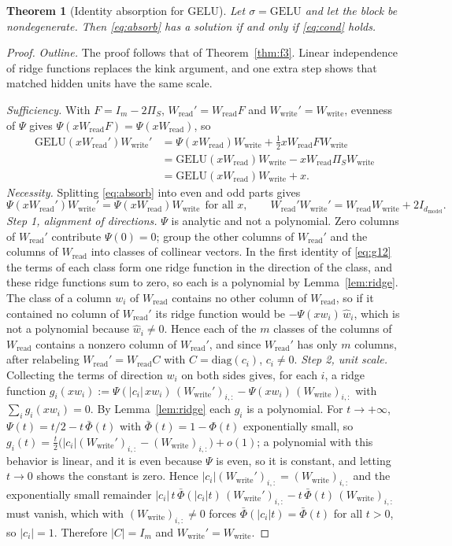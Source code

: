 \documentclass[10pt]{article}
\newtheorem{theorem}{Theorem}[section]
\theoremstyle{definition}
\theoremstyle{remark}
\newcommand{\Wread}{W_{\mathrm{read}}}
\newcommand{\Wwrite}{W_{\mathrm{write}}}
\newcommand{\dm}{d_{\mathrm{model}}}
\begin{document}
\begin{theorem}[Identity absorption for GELU]\label{thm:f4}
Let $\sigma = \mathrm{GELU}$ and let the block be nondegenerate. Then \eqref{eq:absorb} has a solution if and only if \eqref{eq:cond} holds.
\end{theorem}
\begin{proof}
\emph{Outline.} The proof follows that of Theorem~\ref{thm:f3}. Linear independence of ridge functions replaces the kink argument, and one extra step shows that matched hidden units have the same scale.

\emph{Sufficiency.} With $F = I_m - 2\Pi_S$, $\Wread' = \Wread F$ and $\Wwrite' = \Wwrite$, evenness of $\Psi$ gives $\Psi(x\Wread F) = \Psi(x\Wread)$, so
\begin{align*}
\mathrm{GELU}(x\Wread')\Wwrite' &= \Psi(x\Wread)\Wwrite + \tfrac12 x\Wread F\Wwrite \\
&= \mathrm{GELU}(x\Wread)\Wwrite - x\Wread\Pi_S\Wwrite \\
&= \mathrm{GELU}(x\Wread)\Wwrite + x .
\end{align*}
\emph{Necessity.} Splitting \eqref{eq:absorb} into even and odd parts gives
\begin{equation}\label{eq:g12}
\Psi(x\Wread')\Wwrite' = \Psi(x\Wread)\Wwrite\ \ \text{for all } x,\qquad \Wread'\Wwrite' = \Wread\Wwrite + 2I_{\dm} .
\end{equation}
\emph{Step 1, alignment of directions.} $\Psi$ is analytic and not a polynomial. Zero columns of $\Wread'$ contribute $\Psi(0) = 0$; group the other columns of $\Wread'$ and the columns of $\Wread$ into classes of collinear vectors. In the first identity of \eqref{eq:g12} the terms of each class form one ridge function in the direction of the class, and these ridge functions sum to zero, so each is a polynomial by Lemma~\ref{lem:ridge}. The class of a column $w_i$ of $\Wread$ contains no other column of $\Wread$, so if it contained no column of $\Wread'$ its ridge function would be $-\Psi(x w_i)\,\hat w_i$, which is not a polynomial because $\hat w_i \neq 0$. Hence each of the $m$ classes of the columns of $\Wread$ contains a nonzero column of $\Wread'$, and since $\Wread'$ has only $m$ columns, after relabeling $\Wread' = \Wread C$ with $C = \mathrm{diag}(c_i)$, $c_i \neq 0$.
\emph{Step 2, unit scale.} Collecting the terms of direction $w_i$ on both sides gives, for each $i$, a ridge function $g_i(x w_i) := \Psi(|c_i|\,x w_i)\,(\Wwrite')_{i,:} - \Psi(x w_i)\,(\Wwrite)_{i,:}$ with $\sum_i g_i(x w_i) = 0$. By Lemma~\ref{lem:ridge} each $g_i$ is a polynomial. For $t \to +\infty$, $\Psi(t) = t/2 - t\,\bar\Phi(t)$ with $\bar\Phi(t) = 1 - \Phi(t)$ exponentially small, so $g_i(t) = \tfrac{t}{2}\big(|c_i|(\Wwrite')_{i,:} - (\Wwrite)_{i,:}\big) + o(1)$; a polynomial with this behavior is linear, and it is even because $\Psi$ is even, so it is constant, and letting $t \to 0$ shows the constant is zero. Hence $|c_i|(\Wwrite')_{i,:} = (\Wwrite)_{i,:}$ and the exponentially small remainder $|c_i|\,t\,\bar\Phi(|c_i|t)\,(\Wwrite')_{i,:} - t\,\bar\Phi(t)\,(\Wwrite)_{i,:}$ must vanish, which with $(\Wwrite)_{i,:} \neq 0$ forces $\bar\Phi(|c_i|t) = \bar\Phi(t)$ for all $t > 0$, so $|c_i| = 1$. Therefore $|C| = I_m$ and $\Wwrite' = \Wwrite$.

\end{proof}
\end{document}
